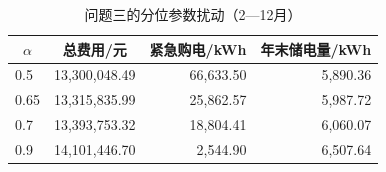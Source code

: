 \par
\begin{table}[!htbp]
\centering
\caption{问题三的分位参数扰动（2—12月）}\label{tab:q3-risk-sensitivity}
\normalsize
\begin{tabular}{lrrr}
\toprule
\multicolumn{1}{c}{$\alpha$} & \multicolumn{1}{c}{总费用/元} & \multicolumn{1}{c}{紧急购电/kWh} & \multicolumn{1}{c}{年末储电量/kWh} \\
\midrule
0.5 & 13,300,048.49 & 66,633.50 & 5,890.36 \\
0.65 & 13,315,835.99 & 25,862.57 & 5,987.72 \\
0.7 & 13,393,753.32 & 18,804.41 & 6,060.07 \\
0.9 & 14,101,446.70 & 2,544.90 & 6,507.64 \\
\bottomrule
\end{tabular}
\end{table}
\par
